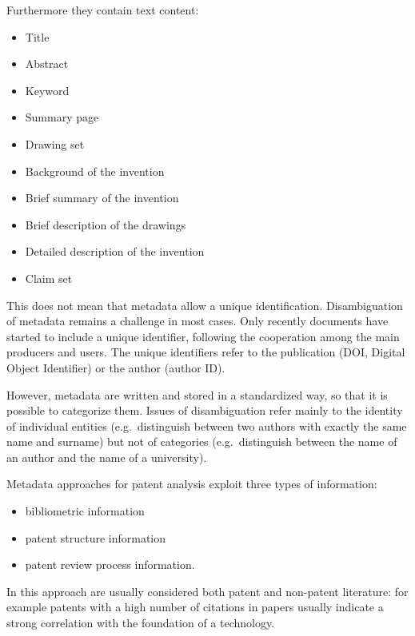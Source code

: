 \documentclass[]{book}
\providecommand{\tightlist}{%
  \setlength{\itemsep}{0pt}\setlength{\parskip}{0pt}}
\theoremstyle{definition}
\theoremstyle{definition}
\theoremstyle{definition}
\theoremstyle{remark}
\begin{document}
Furthermore they contain text content:

\begin{itemize}
\tightlist
\item
  Title
\item
  Abstract
\item
  Keyword
\item
  Summary page
\item
  Drawing set
\item
  Background of the invention
\item
  Brief summary of the invention
\item
  Brief description of the drawings
\item
  Detailed description of the invention
\item
  Claim set
\end{itemize}

This does not mean that metadata allow a unique identification.
Disambiguation of metadata remains a challenge in most cases. Only
recently documents have started to include a unique identifier,
following the cooperation among the main producers and users. The unique
identifiers refer to the publication (DOI, Digital Object Identifier) or
the author (author ID).

However, metadata are written and stored in a standardized way, so that
it is possible to categorize them. Issues of disambiguation refer mainly
to the identity of individual entities (e.g.~distinguish between two
authors with exactly the same name and surname) but not of categories
(e.g.~distinguish between the name of an author and the name of a
university).

Metadata approaches for patent analysis exploit three types of
information:

\begin{itemize}
\tightlist
\item
  bibliometric information
\item
  patent structure information
\item
  patent review process information.
\end{itemize}

In this approach are usually considered both patent and non-patent
literature: for example patents with a high number of citations in
papers usually indicate a strong correlation with the foundation of a
technology.
\end{document}
